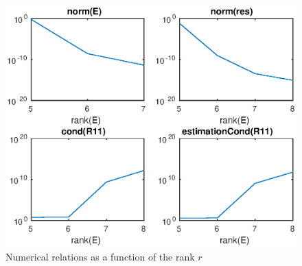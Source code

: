\begin{figure}
\begin{center}
\includegraphics[scale=0.7]{qrPlot.eps}
\caption{Numerical relations as a function of the rank $r$}
\label{qr}
\end{center}
\end{figure}

\FloatBarrier








